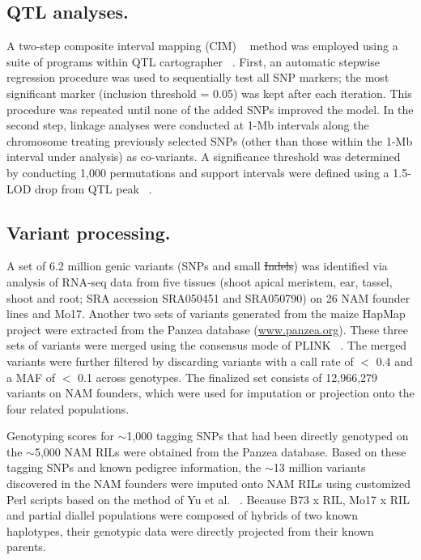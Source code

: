 \documentclass[10pt,letterpaper]{article}
\providecommand{\DIFaddtex}[1]{{\protect\color{blue}\uwave{#1}}} %
\providecommand{\DIFdeltex}[1]{{\protect\color{red}\sout{#1}}}                      %
\providecommand{\DIFaddbegin}{} %
\providecommand{\DIFaddend}{} %
\providecommand{\DIFdelbegin}{} %
\providecommand{\DIFdelend}{} %
\providecommand{\DIFadd}[1]{\texorpdfstring{\DIFaddtex{#1}}{#1}} %
\providecommand{\DIFdel}[1]{\texorpdfstring{\DIFdeltex{#1}}{}} %
\begin{document}
\subsection*{QTL analyses.}
A two-step composite interval mapping (CIM) ~\cite{Zeng1993} method was employed using a suite of programs within QTL cartographer ~\cite{DaCostaE.Silva2012}. First, an automatic \DIFaddbegin \DIFadd{forward }\DIFaddend stepwise regression procedure was used to sequentially test all SNP markers; the most significant marker (inclusion threshold = 0.05) was kept after each iteration. This procedure was repeated until none of the added SNPs improved the model. In the second step, linkage analyses were conducted at 1-Mb intervals along the chromosome treating previously selected SNPs (other than those within the 1-Mb interval under analysis) as co-variants. A significance threshold was determined by conducting 1,000 permutations and support intervals were defined using a 1.5-LOD drop from QTL peak ~\cite{Lander1989}.

\subsection*{Variant processing.}
A set of 6.2 million genic variants (SNPs and small \DIFdelbegin \DIFdel{Indels}\DIFdelend \DIFaddbegin \DIFadd{InDels}\DIFaddend ) was identified via analysis of RNA-seq data from five tissues (shoot apical meristem, ear, tassel, shoot and root; SRA accession SRA050451 and SRA050790) on 26 NAM founder lines and Mo17. Another two sets of variants generated from the maize HapMap project were extracted from the Panzea database (\url{www.panzea.org}). These three sets of variants were merged using the consensus mode of PLINK ~\cite{Purcell2007}. The merged variants were further filtered by discarding variants with a call rate of $<$ 0.4 and a MAF of $<$ 0.1 across genotypes. The finalized set consists of 12,966,279 variants on NAM founders, which were used for imputation or projection onto the four related populations.

Genotyping scores for $\sim$1,000 tagging SNPs that had been directly genotyped on the $\sim$5,000 NAM RILs were obtained from the Panzea database. Based on these tagging SNPs and known pedigree information, the $\sim$13 million variants discovered in the NAM founders were imputed onto NAM RILs using customized Perl scripts based on the method of Yu et al. ~\cite{Yu2008}. Because B73 x RIL, Mo17 x RIL and partial diallel populations were composed of hybrids of two known haplotypes, their genotypic data were directly projected from their known parents. 
\end{document}
